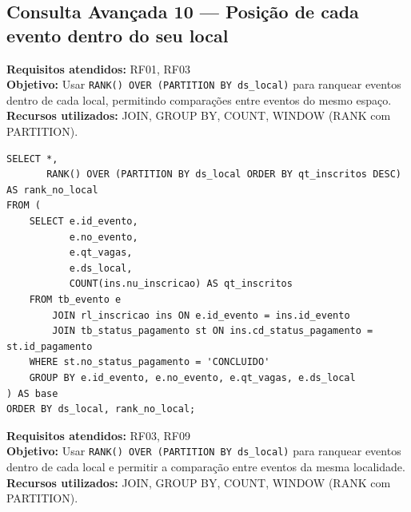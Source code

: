 \documentclass[12pt]{article}
\begin{document}
\subsection{Consulta Avançada 10 --- Posição de cada evento dentro do seu local}
\textbf{Requisitos atendidos:} RF01, RF03 \\
\textbf{Objetivo:} Usar \texttt{RANK() OVER (PARTITION BY ds\_local)} para ranquear eventos dentro de cada local, permitindo comparações entre eventos do mesmo espaço. \\
\textbf{Recursos utilizados:} JOIN, GROUP BY, COUNT, WINDOW (RANK com PARTITION).
\begin{lstlisting}[caption={QA10 --- Posição de cada evento dentro do seu local.}]
SELECT *,
       RANK() OVER (PARTITION BY ds_local ORDER BY qt_inscritos DESC) AS rank_no_local
FROM (
    SELECT e.id_evento,
           e.no_evento,
           e.qt_vagas,
           e.ds_local,
           COUNT(ins.nu_inscricao) AS qt_inscritos
    FROM tb_evento e
        JOIN rl_inscricao ins ON e.id_evento = ins.id_evento
        JOIN tb_status_pagamento st ON ins.cd_status_pagamento = st.id_pagamento
    WHERE st.no_status_pagamento = 'CONCLUIDO'
    GROUP BY e.id_evento, e.no_evento, e.qt_vagas, e.ds_local
) AS base
ORDER BY ds_local, rank_no_local;
\end{lstlisting}
\textbf{Requisitos atendidos:} RF03, RF09 \\
\textbf{Objetivo:} Usar \texttt{RANK() OVER (PARTITION BY ds\_local)} para ranquear eventos dentro de cada local e permitir a comparação entre eventos da mesma localidade. \\
\textbf{Recursos utilizados:} JOIN, GROUP BY, COUNT, WINDOW (RANK com PARTITION).
\end{document}
